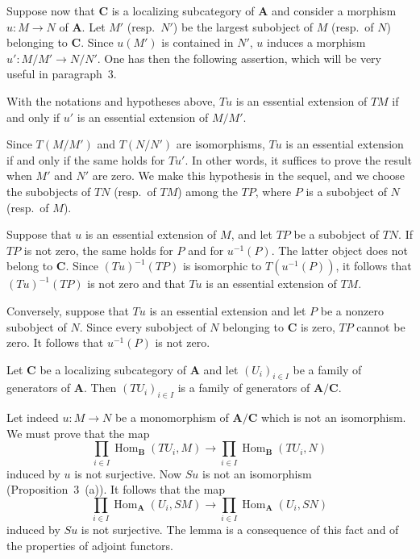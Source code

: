Suppose now that $\mathbf C$ is a localizing subcategory of $\mathbf A$
and consider a morphism $u\colon M\to N$ of $\mathbf A$. Let $M'$
(resp.\ $N'$) be the largest subobject of $M$ (resp.\ of $N$)
belonging to $\mathbf C$. Since $u(M')$ is contained in $N'$, $u$
induces a morphism $u'\colon M/M'\to N/N'$. One has then the following
assertion, which will be very useful in paragraph~3.

\begin{lemma}
With the notations and hypotheses above, $Tu$ is an essential extension
of $TM$ if and only if $u'$ is an essential extension of $M/M'$.
\end{lemma}

Since $T(M/M')$ and $T(N/N')$ are isomorphisms, $Tu$ is an essential
extension if and only if the same holds for $Tu'$. In other words, it
suffices to prove the result when $M'$ and $N'$ are zero. We make this
hypothesis in the sequel, and we choose the subobjects of $TN$ (resp.\ of
$TM$) among the $TP$, where $P$ is a subobject of $N$ (resp.\ of $M$).

Suppose that $u$ is an essential extension of $M$, and let $TP$ be a
subobject of $TN$. If $TP$ is not zero, the same holds for $P$ and for
$u^{-1}(P)$. The latter object does not belong to $\mathbf C$. Since
$(Tu)^{-1}(TP)$ is isomorphic to $T(u^{-1}(P))$, it follows that
$(Tu)^{-1}(TP)$ is not zero and that $Tu$ is an essential extension of
$TM$.

Conversely, suppose that $Tu$ is an essential extension and let $P$ be a
nonzero subobject of $N$. Since every subobject of $N$ belonging to
$\mathbf C$ is zero, $TP$ cannot be zero. It follows that
$u^{-1}(P)$ is not zero.

\begin{lemma}
Let $\mathbf C$ be a localizing subcategory of $\mathbf A$ and let
$(U_i)_{i\in I}$ be a family of generators of $\mathbf A$. Then
$(TU_i)_{i\in I}$ is a family of generators of $\mathbf A/\mathbf C$.
\end{lemma}

Let indeed $u\colon M\to N$ be a monomorphism of $\mathbf A/\mathbf C$
which is not an isomorphism. We must prove that the map
\[
  \prod_{i\in I}\operatorname{Hom}_{\mathbf B}(TU_i,M)
  \longrightarrow
  \prod_{i\in I}\operatorname{Hom}_{\mathbf B}(TU_i,N)
\]
induced by $u$ is not surjective. Now $Su$ is not an isomorphism
(Proposition~3~(a)). It follows that the map
\[
  \prod_{i\in I}\operatorname{Hom}_{\mathbf A}(U_i,SM)
  \longrightarrow
  \prod_{i\in I}\operatorname{Hom}_{\mathbf A}(U_i,SN)
\]
induced by $Su$ is not surjective. The lemma is a consequence of this
fact and of the properties of adjoint functors.

